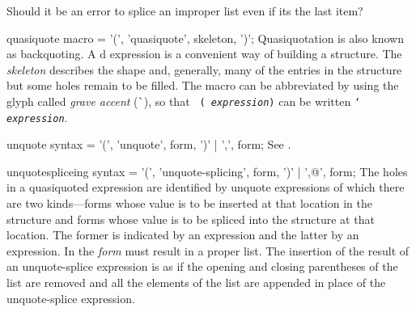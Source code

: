 \gdef\module{syntax-0}
\label{backquote}
%
\begin{optPrivate}
    Should it be an error to splice an improper list even if its the last item?
\end{optPrivate}
%
\begin{optDefinition}

%
\Syntax
\savesyntax\quasiquoteSyntax\vbox{\small\syntax
quasiquote macro
   = '(', 'quasiquote', skeleton, ')';
\endsyntax}
%
\remarks%
Quasiquotation is also known as backquoting.  A d
expression is a convenient way of building a structure.  The {\em skeleton}
describes the shape and, generally, many of the entries in the structure but
some holes remain to be filled.  The  macro can be
abbreviated by using the glyph called {\em grave accent}
(\verb+`+), so that {\tt
    ( {\em expression})} can be written {\tt `{\em
        expression}}.

%
\Syntax
\savesyntax\unquoteSyntax\vbox{\small\syntax
unquote syntax
   = '(', 'unquote', form, ')'
   | ',', form;
\endsyntax}
%
\remarks%
See .

%
\Syntax
\savesyntax\unquotespliceSyntax\vbox{\small\syntax
unquotespliceing syntax
   = '(', 'unquote-splicing', form, ')'
   | ',@', form;
\endsyntax}
%
\remarks%
The holes in a quasiquoted expression are identified by unquote expressions of
which there are two kinds---forms whose value is to be inserted at that location
in the structure and forms whose value is to be spliced into the structure at
that location.  The former is indicated by an  expression and
the latter by an  expression.  In
 the {\em form} must result in a proper list.  The
insertion of the result of an unquote-splice expression is as if the opening and
closing parentheses of the list are removed and all the elements of the list are
appended in place of the unquote-splice expression.


\end{optDefinition}

